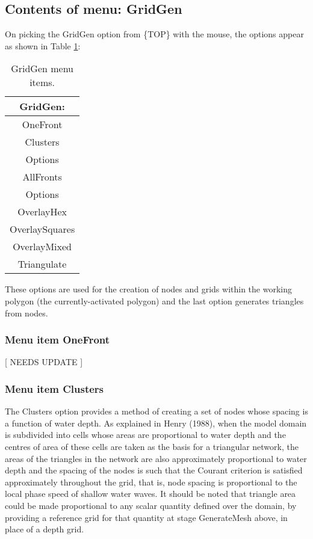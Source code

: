 \documentclass{article}
\begin{document}
\subsection{Contents of menu: GridGen}
On picking the GridGen option from \{TOP\} with the mouse, the options appear as shown in Table \ref{tab:GRIDGEN}:

\begin{table}[htb!]
 \caption{GridGen menu items.}
  \begin{center}
   \begin{tabular}{|c|}
    \hline
GridGen:\\     \hline
OneFront \\     \hline
Clusters \\ Options \\     \hline
AllFronts \\ Options \\     \hline
OverlayHex \\ OverlaySquares \\ OverlayMixed \\     \hline
Triangulate \\
    \hline
   \end{tabular}
   \label{tab:GRIDGEN}
  \end{center}
\end{table}


These options are used for the creation of nodes and grids within the working polygon (the currently-activated polygon) and the last option generates triangles from nodes.

\subsubsection[Menu item OneFront]{Menu item OneFront}
[ NEEDS UPDATE ]
\subsubsection[Menu item Clusters]{Menu item Clusters}

The Clusters option provides a method of creating a set of nodes whose spacing is a function of water depth. As explained in Henry (1988), when the model domain is subdivided into cells whose areas are proportional to water depth and the centres of area of these cells are taken as the basis for a triangular network, the areas of the triangles in the network are also approximately proportional to water depth and the spacing of the nodes is such that the Courant criterion is satisfied approximately throughout the grid, that is, node spacing is proportional to the local phase speed of shallow water waves. It should be noted that triangle area could be made proportional to any scalar quantity defined over the domain, by providing a reference grid for that quantity at stage GenerateMesh above, in place of a depth grid.
\end{document}
